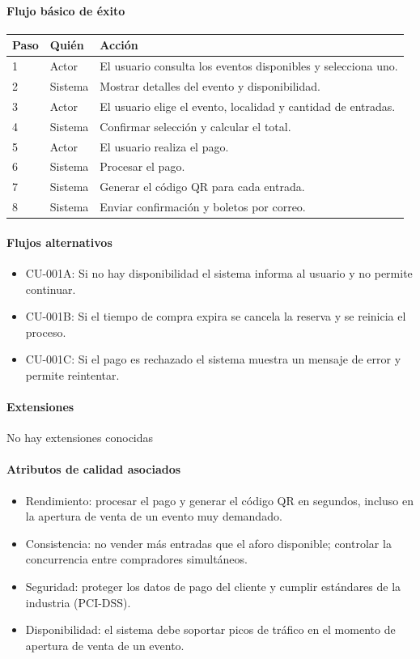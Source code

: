 \paragraph{Flujo básico de éxito}
\begin{longtable}{P{1.1cm}P{1.8cm}P{10.5cm}}
\toprule
\textbf{Paso} & \textbf{Quién} & \textbf{Acción}\\
\midrule
{} & Actor & El usuario consulta los eventos disponibles y selecciona uno.\\
2 & Sistema & Mostrar detalles del evento y disponibilidad.\\
3 & Actor & El usuario elige el evento, localidad y cantidad de entradas.\\
4 & Sistema & Confirmar selección y calcular el total.\\
5 & Actor & El usuario realiza el pago.\\
6 & Sistema & Procesar el pago.\\
7 & Sistema & Generar el código QR para cada entrada.\\
8 & Sistema & Enviar confirmación y boletos por correo.\\
\bottomrule
\end{longtable}

\paragraph{Flujos alternativos}
\begin{itemize}[leftmargin=1.4em, topsep=1pt]
  \item CU-001A: Si no hay disponibilidad el sistema informa al usuario y no permite continuar.
  \item CU-001B: Si el tiempo de compra expira se cancela la reserva y se reinicia el proceso.
  \item CU-001C: Si el pago es rechazado el sistema muestra un mensaje de error y permite reintentar.
\end{itemize}

\paragraph{Extensiones}
No hay extensiones conocidas

\paragraph{Atributos de calidad asociados}
\begin{itemize}[leftmargin=1.4em, topsep=1pt]
  \item Rendimiento: procesar el pago y generar el código QR en segundos, incluso en la apertura de venta de un evento muy demandado.
  \item Consistencia: no vender más entradas que el aforo disponible; controlar la concurrencia entre compradores simultáneos.
  \item Seguridad: proteger los datos de pago del cliente y cumplir estándares de la industria (PCI-DSS).
  \item Disponibilidad: el sistema debe soportar picos de tráfico en el momento de apertura de venta de un evento.
\end{itemize}

